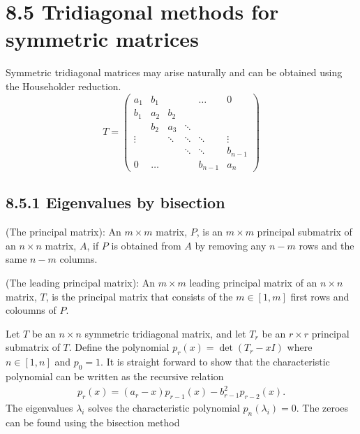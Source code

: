 \section*{8.5 Tridiagonal methods for symmetric matrices}%

Symmetric tridiagonal matrices may arise naturally and can be obtained using the Householder reduction.
\begin{equation}
T=
	\left(
	\begin{matrix}
		a_1 & b_1 & 	&  		& \dots & 0\\
		b_1 & a_2 & b_2 & 		&  		& \\
		   & b_2 & a_3 & \ddots   & 		& \\
		\vdots 	&  &\ddots  & \ddots	& \ddots	& \vdots\\
			& 	  & 	& \ddots		& \ddots		& b_{n-1} \\
		0	& \dots	  & 	& 		& b_{n-1}& a_n 
	\end{matrix}
	\right)
\end{equation}

\subsection*{8.5.1 Eigenvalues by bisection}%

\begin{definition}(The principal matrix):
	An $m\times m$ matrix, $P$, is an $m\times m$ principal submatrix of an $n\times n$ matrix, $A$, if $P$ is obtained from $A$ by removing any $n - m$ rows and the same $n - m$ columns. 
\end{definition}
\begin{definition}(The leading principal matrix): An $m\times m$ leading principal matrix of an $n\times n$ matrix, $T$, 
is the principal matrix that consists of the $m\in [1,m]$ first rows and coloumns of $P$.
\end{definition}

Let $T$ be an $n\times n$ symmetric tridiagonal matrix, and let $T_r$ be an $r\times r$ principal submatrix of $T$.
Define the polynomial $p_r(x) = \det(T_r - xI)$ where $n\in[1,n]$ and $p_0=1$. It is straight forward to show that the characteristic polynomial can be written
as the recursive relation
\begin{align}
	p_r(x) = (a_r-x)p_{r-1}(x) - b_{r-1}^2p_{r-2}(x).
\end{align}
The eigenvalues $\lambda_i$ solves the characteristic polynomial $p_n(\lambda_i)=0$. The zeroes can be found using the bisection method

